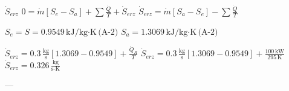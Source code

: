 \( \dot{S}_{erz} \)  
\( 0 = \dot{m} [S_e - S_a] + \sum \frac{\dot{Q}}{T} + \dot{S}_{erz} \)  
\( \dot{S}_{erz} = \dot{m} [S_a - S_e] - \sum \frac{\dot{Q}}{T} \)  

\( S_e = S = 0.9549 \, \text{kJ/kg·K} \, \text{(A-2)} \)  
\( S_a = 1.3069 \, \text{kJ/kg·K} \, \text{(A-2)} \)  

\( \dot{S}_{erz} = 0.3 \, \frac{\text{kg}}{\text{s}} \left[ 1.3069 - 0.9549 \right] + \frac{\dot{Q}_R}{T} \)  
\( \dot{S}_{erz} = 0.3 \, \frac{\text{kg}}{\text{s}} \left[ 1.3069 - 0.9549 \right] + \frac{100 \, \text{kW}}{295 \, \text{K}} \)  
\( \dot{S}_{erz} = 0.326 \, \frac{\text{kg}}{\text{s·K}} \)

---